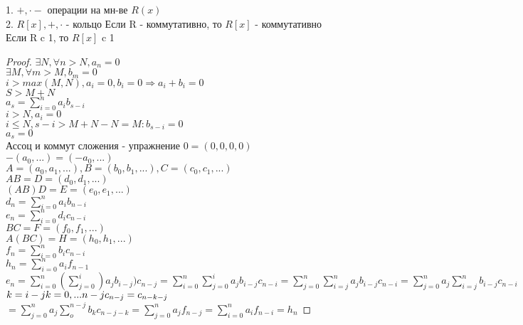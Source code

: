 \begin{theorem}
	1. $ +, \cdot - $ операции на мн-ве $ R(x)$ \\
	2. $ R[x], +, \cdot $ - кольцо 
	Если R - коммутативно, то $ R[x] $ - коммутативно \\
	Если R c 1, то $ R[x] $ c 1
	\begin{proof}
		$ \exists N, \forall n > N, a_n = 0 $ \\
		$ \exists M, \forall m > M, b_m = 0 $ \\
		$ i > max(M, N), a_i = 0, b_i = 0 \Rightarrow a_i + b_i = 0 $\\
		
		$ S > M+N $ \\
		$ a_s = \sum_{i=0}^{n} a_i b_{s-i} $ \\
		$ i > N, a_i = 0 $ \\
		$ i \leq N, s-i > M + N - N = M : b_{s-i} = 0 $ \\
		$ a_s = 0 $ \\
		Ассоц и коммут сложения - упражнение
		$ 0 = (0, 0, 0, 0) $ \\
		$ -(a_0, ...) = (-a_0, ...) $ \\
		$ A = (a_0, a_1, ...), B= (b_0, b_1, ...), C = (c_0, c_1, ...) $ \\
		$ AB = D = (d_0, d_1, ...) $\\
		$(AB)D = E = (e_0, e_1, ...) $ \\
		$ d_n = \sum_{i=0}^{n} a_i b_{n-i} $ \\
		$ e_n = \sum_{i=0}^{n} d_i c_{n-i} $ \\
		$ BC = F = (f_0, f_1, ...) $ \\
		$ A(BC) = H = (h_0, h_1, ...) $ \\
		$ f_n = \sum_{i=0}^{n} b_i c_{n-i} $ \\
		$ h_n = \sum_{i=0}^{n} a_i f_{n-1} $ \\
		$ e_n = \sum_{i=0}^{n} ( \sum_{j=0}^{i}) a_j b_{i-j} ) c_{n-j} = \sum_{i=0}^{n} \sum_{j=0}^{i} a_j b_{i-j} c_{n-i}  = \sum_{j=0}^{n} \sum_{i=j}^{n} a_j b_{i-j} c_{n-i} =  \sum_{j=0}^{n} a_j \sum_{i=j}^{n} b_{i-j} c_{n-i}$ 
		$
		k = i - j  \\
		k = 0, ... n - j  \\
       c_{n-j} = c_{n-k-j}  \\$ \\
		$ = \sum_{j=0}^{n} a_j \sum_{o}^{n-j} b_k c_{n-j-k} = \sum_{j=0}^{n} a_j f_{n-j}= \sum_{i=0}^{n} a_i f_{n-i} = h_n $  
		 

\end{proof}
\end{theorem}
